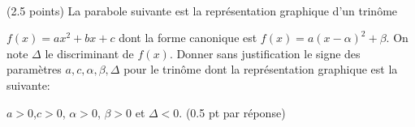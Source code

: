 \documentclass[a4paper,11pt]{article}
\theoremstyle{break}
\begin{document}
 
  \vspace{0.5cm}
  ~
  
  \begin{exo}(2.5 points)
  La parabole suivante est la représentation graphique d'un trinôme 
  
  $f(x)=ax^2+bx+c$ dont la forme canonique est $f(x)=a(x-\alpha)^2+\beta$. On note $\Delta$ le discriminant de $f(x)$.
  Donner sans justification le signe des paramètres 
  $a,c,\alpha,\beta,\Delta$ 
  pour le trinôme
  dont la représentation graphique est la suivante:
  
  \begin{center}
   \end{center}

\begin{correction}
 
  $a>0$,$c>0$, $\alpha>0$, $\beta>0$ et $\Delta<0$. (0.5 pt par r\'eponse)
 
\end{correction}
  
  \end{exo}
    
  
  \vspace{0.5cm}
  ~
  
\end{document}
